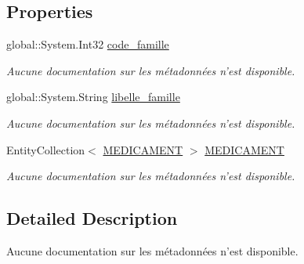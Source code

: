 \subsection*{Properties}
\begin{DoxyCompactItemize}
\item 
global\-::\-System.\-Int32 \hyperlink{class_model_1_1_f_a_m_i_l_l_e_abc071e19c0a17263b4832abe947dbe63}{code\-\_\-famille}
\begin{DoxyCompactList}\small\item\em Aucune documentation sur les métadonnées n'est disponible. \end{DoxyCompactList}\item 
global\-::\-System.\-String \hyperlink{class_model_1_1_f_a_m_i_l_l_e_a6ad0fa990e4747965f85c31ff3a67670}{libelle\-\_\-famille}
\begin{DoxyCompactList}\small\item\em Aucune documentation sur les métadonnées n'est disponible. \end{DoxyCompactList}\item 
Entity\-Collection$<$ \hyperlink{class_model_1_1_m_e_d_i_c_a_m_e_n_t}{M\-E\-D\-I\-C\-A\-M\-E\-N\-T} $>$ \hyperlink{class_model_1_1_f_a_m_i_l_l_e_a452d5c108f134bb766652c9d5b684512}{M\-E\-D\-I\-C\-A\-M\-E\-N\-T}
\begin{DoxyCompactList}\small\item\em Aucune documentation sur les métadonnées n'est disponible. \end{DoxyCompactList}\end{DoxyCompactItemize}


\subsection{Detailed Description}
Aucune documentation sur les métadonnées n'est disponible. 



